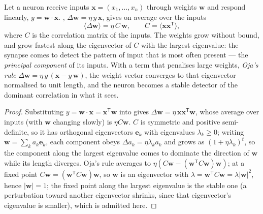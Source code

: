 \begin{theorem}\label{thm:b3:learning-memory:hebb}
Let a neuron receive inputs $\mathbf{x} = (x_{1},\dots,x_{n})$ through
weights $\mathbf{w}$ and respond linearly, $y = \mathbf{w}\cdot\mathbf{x}$.
, $\Delta\mathbf{w} = \eta\, y\,\mathbf{x}$, gives on average
over the inputs
\[
\langle\Delta\mathbf{w}\rangle = \eta\,C\,\mathbf{w}, \qquad C =
\langle\mathbf{x}\mathbf{x}^{\mathsf{T}}\rangle ,
\]
where $C$ is the correlation matrix of the inputs. The weights grow
without bound, and grow fastest along the eigenvector of $C$ with the
largest eigenvalue: the synapse comes to detect the pattern of input
that is most often present --- the \emph{principal component} of its
inputs. With a term that penalises large weights, \emph{Oja's rule}
$\Delta\mathbf{w} = \eta\, y\,(\mathbf{x} - y\,\mathbf{w})$, the weight
vector converges to that eigenvector normalised to unit length, and the
neuron becomes a stable detector of the dominant correlation in what it
sees.
\end{theorem}
\begin{proof}
Substituting $y = \mathbf{w}\cdot\mathbf{x} = \mathbf{x}^{\mathsf{T}}
\mathbf{w}$ into  gives $\Delta\mathbf{w} = \eta\,\mathbf{x}
\mathbf{x}^{\mathsf{T}}\mathbf{w}$, whose average over inputs (with
$\mathbf{w}$ changing slowly) is $\eta C\mathbf{w}$. $C$ is symmetric and
positive semi-definite, so it has orthogonal eigenvectors $\mathbf{e}_{k}$
with eigenvalues $\lambda_{k} \ge 0$; writing $\mathbf{w} = \sum_{k}
a_{k}\mathbf{e}_{k}$, each component obeys $\Delta a_{k} = \eta\lambda_{k}
a_{k}$ and grows as $(1 + \eta\lambda_{k})^{t}$, so the component along
the largest eigenvalue comes to dominate the direction of $\mathbf{w}$
while its length diverges. Oja's rule averages to $\eta(C\mathbf{w} -
(\mathbf{w}^{\mathsf{T}}C\mathbf{w})\mathbf{w})$; at a fixed point
$C\mathbf{w} = (\mathbf{w}^{\mathsf{T}}C\mathbf{w})\mathbf{w}$, so
$\mathbf{w}$ is an eigenvector with $\lambda = \mathbf{w}^{\mathsf{T}}
C\mathbf{w} = \lambda|\mathbf{w}|^{2}$, hence $|\mathbf{w}| = 1$; the
fixed point along the largest eigenvalue is the stable one (a
perturbation toward another eigenvector shrinks, since that
eigenvector's eigenvalue is smaller), which is admitted here.
\end{proof}

